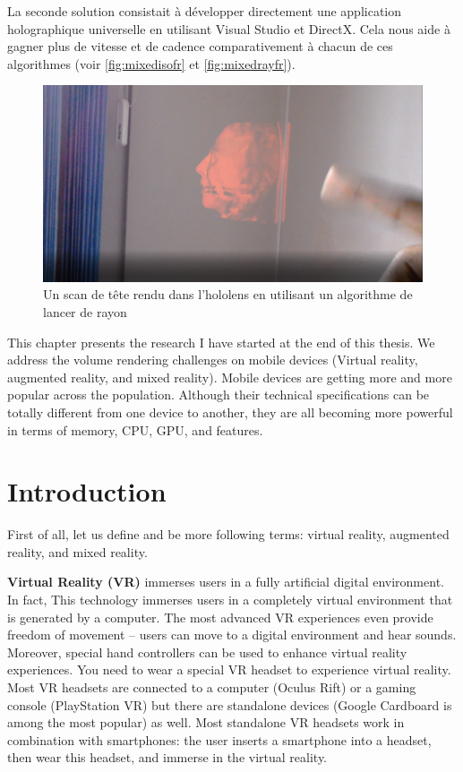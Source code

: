 La seconde solution consistait à développer directement une application holographique universelle en utilisant Visual Studio et DirectX. Cela nous aide à gagner plus de vitesse et de cadence comparativement à chacun de ces algorithmes (voir \autoref{fig:mixedisofr} et \autoref{fig:mixedrayfr}).




\begin{figure}
\centering
\includegraphics [width=\textwidth]{Figures/mixedray}
\caption{Un scan de tête rendu dans l'hololens en utilisant un algorithme de lancer de rayon }
\label{fig:mixedrayfr}
\end{figure}

\NewPage

This chapter presents the research I have started at the end of this thesis. 
We address the volume rendering challenges on mobile devices (Virtual reality, augmented reality, and mixed reality). Mobile devices are getting more and more popular across the population. Although their technical specifications can be totally different from one device to another, they are all becoming more powerful in terms of memory, CPU, GPU, and features.

\section{Introduction}

First of all, let us define and be more following terms: virtual reality, augmented reality, and mixed reality.

\par \textbf{ Virtual Reality (VR)} immerses users in a fully artificial digital environment. In fact, This technology immerses users in a completely virtual environment that is generated by a computer. The most advanced VR experiences even provide freedom of movement – users can move to a digital environment and hear sounds. Moreover, special hand controllers can be used to enhance virtual reality experiences.\newline
You need to wear a special VR headset to experience virtual reality. Most VR headsets are connected to a computer (Oculus Rift) or a gaming console (PlayStation VR) but there are standalone devices (Google Cardboard is among the most popular) as well. Most standalone VR headsets work in combination with smartphones: the user inserts a smartphone into a headset, then wear this headset, and immerse in the virtual reality.


